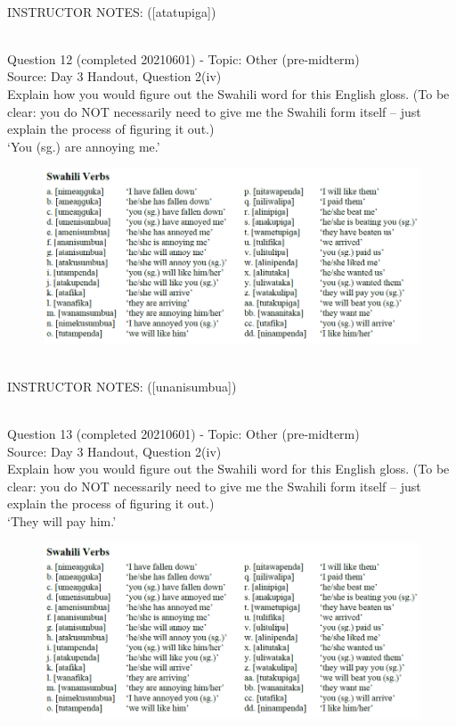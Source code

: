 \documentclass[12pt]{article}
\begin{document}
~\\
INSTRUCTOR NOTES: ([atatupiga])


~\\

{\large Question 12} (completed 20210601) - Topic: Other (pre-midterm)\\
Source: Day 3 Handout, Question 2(iv)\\

Explain how you would figure out the Swahili word for this English gloss. (To be clear: you do NOT necessarily need to give me the Swahili form itself -- just explain the process of figuring it out.)\\

‘You (sg.) are annoying me.’

\begin{figure}[H]
\includegraphics{../images/swahiliverbs.png}
\end{figure}

~\\
INSTRUCTOR NOTES: ([unanisumbua])


~\\

{\large Question 13} (completed 20210601) - Topic: Other (pre-midterm)\\
Source: Day 3 Handout, Question 2(iv)\\

Explain how you would figure out the Swahili word for this English gloss. (To be clear: you do NOT necessarily need to give me the Swahili form itself -- just explain the process of figuring it out.)\\

‘They will pay him.’

\begin{figure}[H]
\includegraphics{../images/swahiliverbs.png}
\end{figure}
\end{document}
